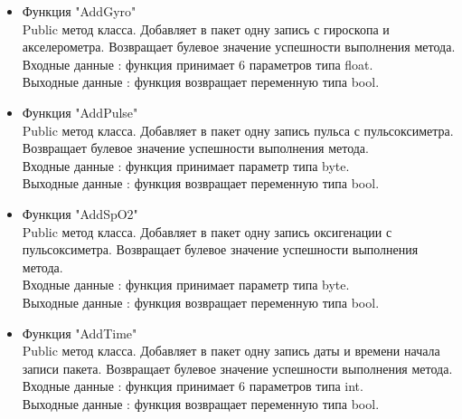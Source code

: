 \documentclass[a4document]{article}
\begin{document}
{\begin{itemize}
\begin{itemize}
                \item Функция "AddGyro" \\
                    Public метод класса. Добавляет в пакет одну запись с гироскопа и акселерометра. 
                    Возвращает булевое значение успешности выполнения метода.\\
                    Входные данные : функция принимает 6 параметров типа float. \\
                    Выходные данные : функция возвращает переменную типа bool.
                \item Функция "AddPulse" \\
                    Public метод класса. Добавляет в пакет одну запись пульса с пульсоксиметра. 
                    Возвращает булевое значение успешности выполнения метода.\\
                    Входные данные : функция принимает параметр типа byte. \\
                    Выходные данные : функция возвращает переменную типа bool.
                \item Функция "AddSpO2" \\
                    Public метод класса. Добавляет в пакет одну запись оксигенации с пульсоксиметра. 
                    Возвращает булевое значение успешности выполнения метода.\\
                    Входные данные : функция принимает параметр типа byte. \\
                    Выходные данные : функция возвращает переменную типа bool.
                \item Функция "AddTime" \\
                    Public метод класса. Добавляет в пакет одну запись даты и времени начала записи пакета.
                    Возвращает булевое значение успешности выполнения метода.\\
                    Входные данные : функция принимает 6 параметров типа int. \\
                    Выходные данные : функция возвращает переменную типа bool.

                
            \end{itemize}
        

\end{itemize}}
\end{document}
